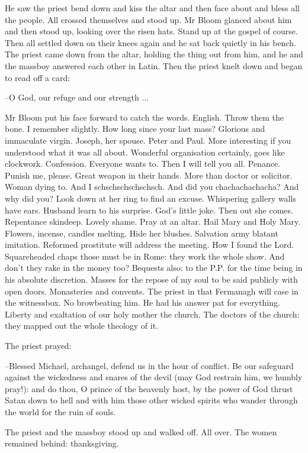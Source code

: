 He saw the priest bend down and kiss the altar and then face about
and bless all the people. All crossed themselves and stood up. Mr Bloom
glanced about him and then stood up, looking over the risen hats. Stand up
at the gospel of course. Then all settled down on their knees again and he
sat back quietly in his bench. The priest came down from the altar,
holding the thing out from him, and he and the massboy answered each other
in Latin. Then the priest knelt down and began to read off a card:

--O God, our refuge and our strength ...

Mr Bloom put his face forward to catch the words. English. Throw
them the bone. I remember slightly. How long since your last mass?
Glorious and immaculate virgin. Joseph, her spouse. Peter and Paul. More
interesting if you understood what it was all about. Wonderful
organisation certainly, goes like clockwork. Confession. Everyone wants
to. Then I will tell you all. Penance. Punish me, please. Great weapon in
their hands. More than doctor or solicitor. Woman dying to. And I
schschschschschsch. And did you chachachachacha? And why did you? Look
down at her ring to find an excuse. Whispering gallery walls have ears.
Husband learn to his surprise. God's little joke. Then out she comes.
Repentance skindeep. Lovely shame. Pray at an altar. Hail Mary and
Holy Mary. Flowers, incense, candles melting. Hide her blushes.
Salvation army blatant imitation. Reformed prostitute will address
the meeting. How I found the Lord. Squareheaded chaps those must be
in Rome: they work the whole show. And don't they rake in the money too?
Bequests also: to the P.P. for the time being in his absolute discretion.
Masses for the repose of my soul to be said publicly with open doors.
Monasteries and convents. The priest in that Fermanagh will case in
the witnessbox. No browbeating him. He had his answer pat for everything.
Liberty and exaltation of our holy mother the church. The doctors of the
church: they mapped out the whole theology of it.

The priest prayed:

--Blessed Michael, archangel, defend us in the hour of conflict. Be our
safeguard against the wickedness and snares of the devil (may God restrain
him, we humbly pray!): and do thou, O prince of the heavenly host, by the
power of God thrust Satan down to hell and with him those other wicked
spirits who wander through the world for the ruin of souls.

The priest and the massboy stood up and walked off. All over. The
women remained behind: thanksgiving.

